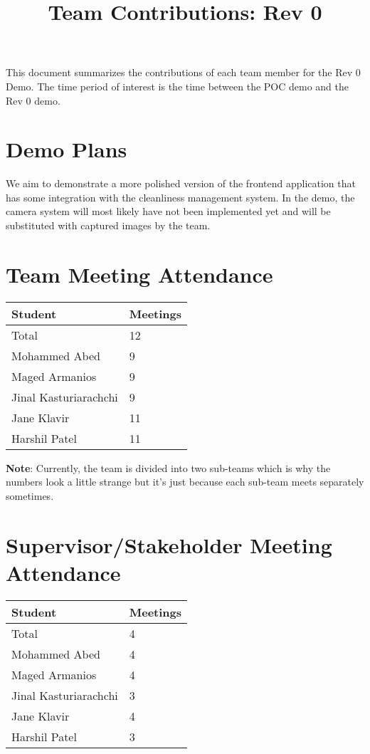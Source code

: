 \documentclass{article}
\title{Team Contributions: Rev 0\\\progname}
\author{\authname}
\date{}
\begin{document}
\maketitle

This document summarizes the contributions of each team member for the Rev 0
Demo.  The time period of interest is the time between the POC demo and the Rev
0 demo.

\section{Demo Plans}
We aim to demonstrate a more polished version of the frontend application that has some integration with the cleanliness management system. In the demo, the camera system will most likely have not been implemented yet and will be substituted with captured images by the team.

\section{Team Meeting Attendance}
\begin{table}[H]
\centering
\begin{tabular}{ll}
\toprule
\textbf{Student} & \textbf{Meetings}\\
\midrule
Total & 12\\
Mohammed Abed & 9\\
Maged Armanios & 9\\
Jinal Kasturiarachchi & 9\\
Jane Klavir & 11\\
Harshil Patel & 11\\
\bottomrule
\end{tabular}
\end{table}

\textbf{Note}: Currently, the team is divided into two sub-teams which is why the numbers look a little strange but it's just because each sub-team meets separately sometimes.

\section{Supervisor/Stakeholder Meeting Attendance}


\begin{table}[H]
\centering
\begin{tabular}{ll}
\toprule
\textbf{Student} & \textbf{Meetings}\\
\midrule
Total & 4\\
Mohammed Abed & 4\\
Maged Armanios & 4\\
Jinal Kasturiarachchi & 3\\
Jane Klavir & 4\\
Harshil Patel & 3\\
\bottomrule
\end{tabular}
\end{table}
\end{document}

